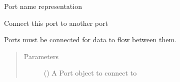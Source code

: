 \documentclass[letterpaper,10pt,openany,oneside,english]{sphinxmanual}
\begin{document}
\begin{fulllineitems}
\begin{fulllineitems}
\begin{quote}
\begin{description}
\end{description}\end{quote}

\begin{fulllineitems}
\label{\detokenize{src_rst/port:port.Port.id}}

\end{fulllineitems}


\begin{fulllineitems}
\label{\detokenize{src_rst/port:port.Port.name}}

\end{fulllineitems}


\begin{fulllineitems}
\label{\detokenize{src_rst/port:port.Port.use_mpi}}

\end{fulllineitems}


\end{fulllineitems}


\begin{fulllineitems}
\label{\detokenize{src_rst/port:port.Port.__repr__}}
Port name representation

\end{fulllineitems}


\begin{fulllineitems}
\label{\detokenize{src_rst/port:port.Port.connect}}
Connect this port to another port

Ports must be connected for data to flow between them.
\begin{quote}\begin{description}
\item[{Parameters}] \leavevmode
{} ({\hyperref[\detokenize{src_rst/port:port.Port}]{}}) \textendash{} A Port object to connect to


\end{description}
\end{quote}
\end{fulllineitems}
\end{fulllineitems}
\end{document}
